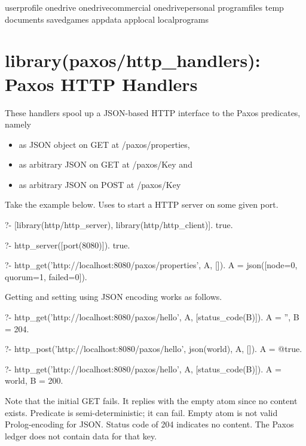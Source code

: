 \begin{code}
userprofile
onedrive
onedrivecommercial
onedrivepersonal
programfiles
temp
documents
savedgames
appdata
applocal
localprograms
\end{code}

\vspace{0.7cm}\chapter{library(paxos/http_handlers): Paxos HTTP Handlers}\label{sec:httphandlers}

These handlers spool up a JSON-based HTTP interface to the Paxos
predicates, namely

\begin{itemize}
    \item {} as JSON object on GET at /paxos/properties,
    \item {} as arbitrary JSON on GET at /paxos/Key and
    \item {} as arbitrary JSON on POST at /paxos/Key
\end{itemize}

Take the example below. Uses  to start a HTTP server
on some given port.

\begin{code}
?- [library(http/http_server), library(http/http_client)].
true.

?- http_server([port(8080)]).
true.

?- http_get('http://localhost:8080/paxos/properties', A, []).
A = json([node=0, quorum=1, failed=0]).
\end{code}

Getting and setting using JSON encoding works as follows.

\begin{code}
?- http_get('http://localhost:8080/paxos/hello', A, [status_code(B)]).
A = '',
B = 204.

?- http_post('http://localhost:8080/paxos/hello', json(world), A, []).
A = @true.

?- http_get('http://localhost:8080/paxos/hello', A, [status_code(B)]).
A = world,
B = 200.
\end{code}

Note that the initial GET fails. It replies with the empty atom since no
content exists. Predicate  is semi-deterministic; it can
fail. Empty atom is not valid Prolog-encoding for JSON. Status code of
204 indicates no content. The Paxos ledger does not contain data for
that key.

